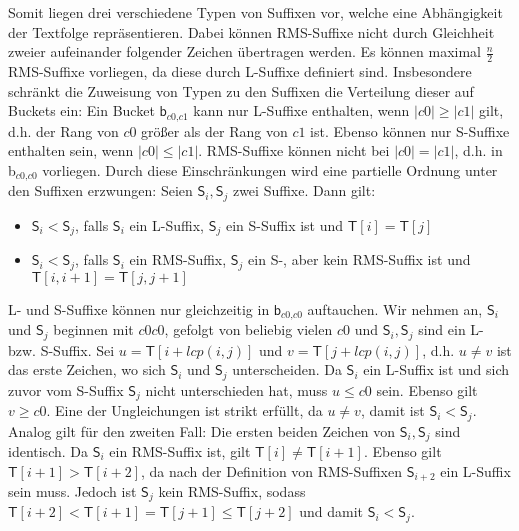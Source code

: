 Somit liegen drei verschiedene Typen von Suffixen vor, welche eine Abhängigkeit der Textfolge repräsentieren. Dabei können RMS-Suffixe nicht durch Gleichheit zweier aufeinander folgender Zeichen übertragen werden. Es können maximal $\frac{n}{2}$ RMS-Suffixe vorliegen, da diese durch L-Suffixe definiert sind. Insbesondere schränkt die Zuweisung von Typen zu den Suffixen die Verteilung dieser auf Buckets ein: Ein Bucket $\mathsf{b}_{\textit{c0,c1}}$ kann nur L-Suffixe enthalten, wenn $|c0| \geq |c1|$ gilt, d.h. der Rang von $c0$ größer als der Rang von $c1$ ist. Ebenso können nur S-Suffixe enthalten sein, wenn $|c0| \leq |c1|$. RMS-Suffixe können nicht bei $|c0|=|c1|$, d.h. in b$_{\textit{c0,c0}}$ vorliegen.
Durch diese Einschränkungen wird eine partielle Ordnung unter den Suffixen erzwungen:
	Seien $\mathsf{S}_i, \mathsf{S}_j$ zwei Suffixe. Dann gilt:
	\begin{itemize}
		\item $\mathsf{S}_i < \mathsf{S}_j$, falls $\mathsf{S}_i$ ein L-Suffix, $\mathsf{S}_j$ ein S-Suffix ist und $\mathsf{T}[i] = \mathsf{T}[j]$
		\item $\mathsf{S}_i < \mathsf{S}_j$, falls $\mathsf{S}_i$ ein RMS-Suffix, $\mathsf{S}_j$ ein S-, aber kein RMS-Suffix ist und $\mathsf{T}[i, i+1] = \mathsf{T}[j, j+1]$
	\end{itemize}

	L- und S-Suffixe können nur gleichzeitig in $\mathsf{b}_{\textit{c0,c0}}$ auftauchen. Wir nehmen an, $\mathsf{S}_i$ und $\mathsf{S}_j$ beginnen mit $c0c0$, gefolgt von beliebig vielen $c0$ und $\mathsf{S}_i, \mathsf{S}_j$ sind ein L- bzw. S-Suffix. Sei $u = \mathsf{T}[i+lcp(i, j)]$ und $v = \mathsf{T}[j+lcp(i, j)]$, d.h. $u \neq v$ ist das erste Zeichen, wo sich $\mathsf{S}_i$ und $\mathsf{S}_j$ unterscheiden. Da $\mathsf{S}_i$ ein L-Suffix ist und sich zuvor vom S-Suffix $\mathsf{S}_j$ nicht unterschieden hat, muss $u \leq c0$ sein. Ebenso gilt $v \geq c0$. Eine der Ungleichungen ist strikt erfüllt, da $u \neq v$, damit ist $\mathsf{S}_i < \mathsf{S}_j$.
	Analog gilt für den zweiten Fall: Die ersten beiden Zeichen von $\mathsf{S}_i, \mathsf{S}_j$ sind identisch. Da $\mathsf{S}_i$ ein RMS-Suffix ist, gilt $\mathsf{T}[i] \neq \mathsf{T}[i+1]$. Ebenso gilt $\mathsf{T}[i+1] > \mathsf{T}[i+2]$, da nach der Definition von RMS-Suffixen $\mathsf{S}_{i+2}$ ein L-Suffix sein muss. Jedoch ist $\mathsf{S}_j$ kein RMS-Suffix, sodass $\mathsf{T}[i+2] < \mathsf{T}[i+1] = \mathsf{T}[j+1] \leq \mathsf{T}[j+2]$ und damit $\mathsf{S}_i < \mathsf{S}_j$. 

